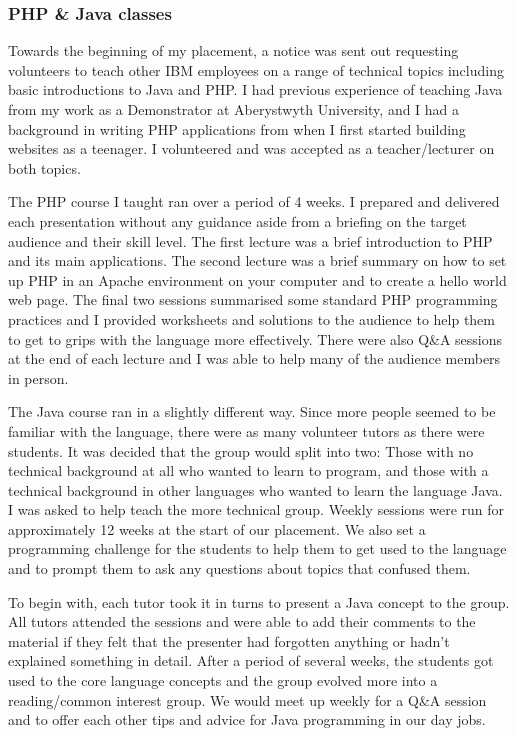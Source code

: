 \documentclass[12pt,a4paper]{article}
\begin{document}
\subsubsection{PHP \& Java classes}
Towards the beginning of my placement, a notice was sent out requesting
volunteers to teach other IBM employees on a range of technical topics including
basic introductions to Java and PHP. I had previous experience of teaching Java
from my work as a Demonstrator at Aberystwyth University, and I had a background
in writing PHP applications from when I first started building websites as a
teenager. I volunteered and was accepted as a teacher/lecturer on both topics.

The PHP course I taught ran over a period of 4 weeks. I prepared and delivered
each presentation without any guidance aside from a briefing on the target
audience and their skill level. The first lecture was a brief introduction to
PHP and its main applications. The second lecture was a brief summary on how to
set up PHP in an Apache environment on your computer and to create a hello world
web page. The final two sessions summarised some standard PHP programming
practices and I provided worksheets and solutions to the audience to help them
to get to grips with the language more effectively. There were also Q\&A
sessions at the end of each lecture and I was able to help many of the audience
members in person.

The Java course ran in a slightly different way. Since more people seemed to be
familiar with the language, there were as many volunteer tutors as there were 
students. It was decided that the group would split into two: Those with no 
technical background at all who wanted to learn to program, and those with 
a technical background in other languages who wanted to learn the language Java.
I was asked to help teach the more technical group. Weekly sessions were run for
approximately 12 weeks at the start of our placement. We also set a programming
challenge for the students to help them to get used to the language and to 
prompt them to ask any questions about topics that confused them.

To begin with, each tutor took it in turns to present a Java concept to the
group. All tutors attended the sessions and were able to add their comments to
the material if they felt that the presenter had forgotten anything or hadn't
explained something in detail. After a period of several weeks, the students 
got used to the core language concepts and the group evolved more into a 
reading/common interest group. We would meet up weekly for a Q\&A session and 
to offer each other tips and advice for Java programming in our day jobs. 
\end{document}
